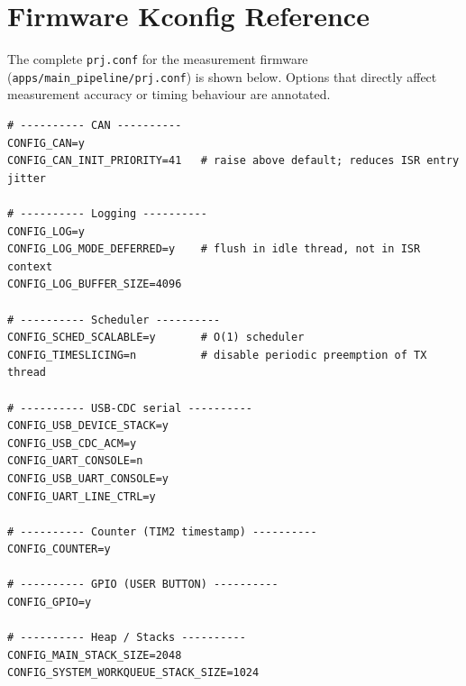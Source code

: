 \documentclass[11pt,a4paper]{article}
\begin{document}
\section{Firmware Kconfig Reference}
\label{app:kconfig}

The complete \texttt{prj.conf} for the measurement firmware
(\texttt{apps/main\_pipeline/prj.conf}) is shown below.  Options that directly
affect measurement accuracy or timing behaviour are annotated.

\begin{lstlisting}[caption={apps/main\_pipeline/prj.conf --- full Kconfig listing}]
# ---------- CAN ----------
CONFIG_CAN=y
CONFIG_CAN_INIT_PRIORITY=41   # raise above default; reduces ISR entry jitter

# ---------- Logging ----------
CONFIG_LOG=y
CONFIG_LOG_MODE_DEFERRED=y    # flush in idle thread, not in ISR context
CONFIG_LOG_BUFFER_SIZE=4096

# ---------- Scheduler ----------
CONFIG_SCHED_SCALABLE=y       # O(1) scheduler
CONFIG_TIMESLICING=n          # disable periodic preemption of TX thread

# ---------- USB-CDC serial ----------
CONFIG_USB_DEVICE_STACK=y
CONFIG_USB_CDC_ACM=y
CONFIG_UART_CONSOLE=n
CONFIG_USB_UART_CONSOLE=y
CONFIG_UART_LINE_CTRL=y

# ---------- Counter (TIM2 timestamp) ----------
CONFIG_COUNTER=y

# ---------- GPIO (USER BUTTON) ----------
CONFIG_GPIO=y

# ---------- Heap / Stacks ----------
CONFIG_MAIN_STACK_SIZE=2048
CONFIG_SYSTEM_WORKQUEUE_STACK_SIZE=1024
\end{lstlisting}
\end{document}
